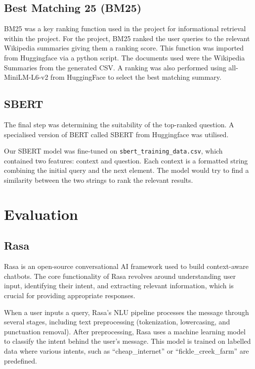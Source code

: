 \documentclass[11pt]{article}
\begin{document}
\subsection{Best Matching 25 (BM25)}
BM25 was a key ranking function used in the project for informational retrieval within the project. For the project, BM25 ranked the user queries to the relevant Wikipedia summaries giving them a ranking score. This function was imported from Huggingface via a python script. 
 \newline
 \newline
The documents used were the Wikipedia Summaries from the generated CSV. A ranking was also performed using all-MiniLM-L6-v2 from HuggingFace to select the best matching summary.


\subsection{SBERT}
The final step was determining the suitability of the top-ranked question. A specialised version of BERT called SBERT from Huggingface was utilised.

Our SBERT model was fine-tuned on \texttt{sbert\_training\_data.csv}, which contained two features: context and question. Each context is a formatted string combining the initial query and the next element. The model would try to find a similarity between the two strings to rank the relevant results.


\section{Evaluation}
\subsection{Rasa}
Rasa is an open-source conversational AI framework used to build context-aware chatbots. The core functionality of Rasa revolves around understanding user input, identifying their intent, and extracting relevant information, which is crucial for providing appropriate responses. 

When a user inputs a query, Rasa's NLU pipeline processes the message through several stages, including text preprocessing (tokenization, lowercasing, and punctuation removal). After preprocessing, Rasa uses a machine learning model to classify the intent behind the user's message. This model is trained on labelled data where various intents, such as “cheap\_internet” or “fickle\_creek\_farm” are predefined.
\end{document}
